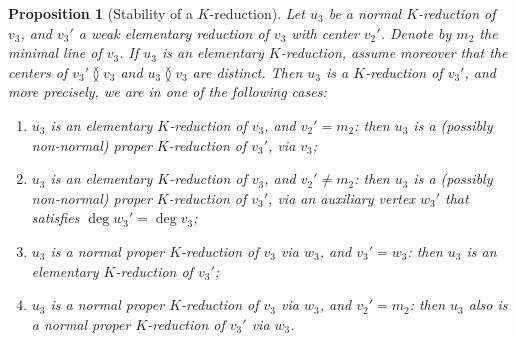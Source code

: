 \documentclass[reqno,oneside,11pt]{amsart}
\theoremstyle{plain}
\newtheorem{proposition}[theorem]{Proposition}
\theoremstyle{definition}
\renewcommand{\ne}{\between}
\begin{document}
\begin{proposition}[Stability of a $K$-reduction]
\label{pro:K stability}
Let $u_3$ be a normal $K$-reduction of $v_3$, and $v_3'$ a weak elementary
reduction of $v_3$ with center $v_2'$.
Denote by $m_2$ the minimal line of $v_3$.
If $u_3$ is an elementary $K$-reduction, assume moreover that the centers of
$v_3' \ne v_3$ and $u_3 \ne v_3$  are distinct.
Then $u_3$ is a $K$-reduction of $v_3'$, and more precisely, we are in one
of the following cases:
\begin{enumerate}
\item \label{Kstability:1} $u_3$ is an elementary $K$-reduction of $v_3$,
and $v_2' = m_2$: then $u_3$ is a (possibly
non-normal) proper $K$-reduction of $v_3'$, via $v_3$;

\item \label{Kstability:2} $u_3$ is an elementary $K$-reduction of $v_3$,
and $v_2' \neq m_2$: then $u_3$ is a (possibly
non-normal) proper $K$-reduction of $v_3'$, via an auxiliary vertex $w_3'$ that
satisfies $\deg w_3' = \deg v_3$;

\item \label{Kstability:3} $u_3$ is a normal proper $K$-reduction of $v_3$ via
$w_3$, and $v_3' = w_3$: then $u_3$ is an elementary $K$-reduction of
$v_3'$;

\item \label{Kstability:4} $u_3$ is a normal proper $K$-reduction of $v_3$ via
$w_3$, and $v_2' = m_2$: then $u_3$
also is a normal proper $K$-reduction of $v_3'$ via $w_3$.
\end{enumerate}
\end{proposition}
\end{document}
